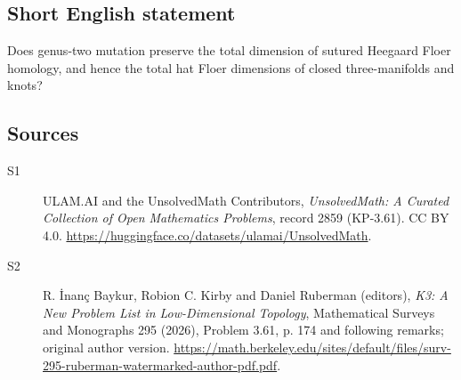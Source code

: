 \documentclass[11pt]{article}
\begin{document}
\subsection{Short English statement}
Does genus-two mutation preserve the total dimension of sutured Heegaard Floer homology, and hence the total hat Floer dimensions of closed three-manifolds and knots?
\subsection{Sources}
\begin{description}
\item[\hypertarget{source:2859:1}{S1}] ULAM.AI and the UnsolvedMath Contributors, \emph{UnsolvedMath: A Curated Collection of Open Mathematics Problems}, record 2859 (KP-3.61). CC BY 4.0. \url{https://huggingface.co/datasets/ulamai/UnsolvedMath}.
\item[\hypertarget{source:2859:2}{S2}] R. İnanç Baykur, Robion C. Kirby and Daniel Ruberman (editors), \emph{K3: A New Problem List in Low-Dimensional Topology}, Mathematical Surveys and Monographs 295 (2026), Problem 3.61, p. 174 and following remarks; original author version. \url{https://math.berkeley.edu/sites/default/files/surv-295-ruberman-watermarked-author-pdf.pdf}.
\end{description}
\label{end:2859}
\end{document}
